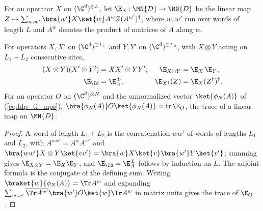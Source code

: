 For an operator $X$ on $(\C^d)^{\otimes L}$, let $\E_X\colon\MN{D}\to\MN{D}$ be
the linear map $Z\mapsto\sum_{w,w'}\bra{w'}X\ket{w}A^wZ(A^{w'})^\dagger$, where
$w,w'$ run over words of length $L$ and $A^w$ denotes the product of matrices of
$A$ along $w$.

\begin{lemma}
    \label{lem:ldp_observable_transfer_products}
    \leanok
    For operators $X,X'$ on $(\C^d)^{\otimes L_1}$ and $Y,Y'$ on
    $(\C^d)^{\otimes L_2}$, with $X\otimes Y$ acting on $L_1+L_2$ consecutive
    sites,
    \begin{align}
        (X\otimes Y)(X'\otimes Y')
         & =XX'\otimes YY',
         &
        \E_{X\otimes Y}
         & =\E_X\,\E_Y,
        \notag                       \\
        \E_{\Id}
         & =\E_A^{\,L},
         &
        \E_{X^\dagger}(Z)
         & =\E_X(Z^\dagger)^\dagger.
        \notag
    \end{align}
    For an operator $O$ on $(\C^d)^{\otimes N}$ and the unnormalized vector
    $\ket{\phi_N(A)}$ of (\ref{eq:ldp_ti_mps}),
    $\bra{\phi_N(A)}O\ket{\phi_N(A)}=\operatorname{tr}\E_O$, the trace of a
    linear map on $\MN{D}$.
\end{lemma}
\begin{proof}
    \leanok
    A word of length $L_1+L_2$ is the concatenation $ww'$ of words of lengths
    $L_1$ and $L_2$, with $A^{ww'}=A^wA^{w'}$ and
    $\bra{ww'}X\otimes Y\ket{vv'}=\bra{w}X\ket{v}\bra{w'}Y\ket{v'}$; summing
    gives $\E_{X\otimes Y}=\E_X\E_Y$, and $\E_{\Id}=\E_A^{\,L}$ follows by
    induction on $L$. The adjoint formula is the conjugate of the defining sum.
    Writing $\braket{w}{\phi_N(A)}=\Tr A^w$ and expanding
    $\sum_{w,w'}\overline{\Tr A^{w'}}\bra{w'}O\ket{w}\Tr A^w$ in matrix units
    gives the trace of $\E_O$.
\end{proof}

